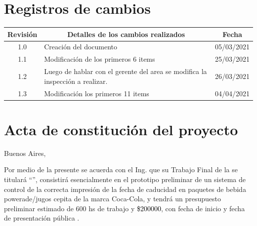\documentclass[11pt]{charter}
\begin{document}
\maketitle
\thispagestyle{empty}
\pagebreak


\thispagestyle{empty}
{\setlength{\parskip}{0pt}
\tableofcontents{}
}
\pagebreak


\section{Registros de cambios}
\label{sec:registro}


\begin{table}[ht]
\label{tab:registro}
\centering
\begin{tabularx}{\linewidth}{@{}|c|X|c|@{}}
\hline
\rowcolor[HTML]{C0C0C0} 
Revisión & \multicolumn{1}{c|}{\cellcolor[HTML]{C0C0C0}Detalles de los cambios realizados} & Fecha      \\ \hline
1.0      & Creación del documento                                          & 05/03/2021\\ \hline
1.1      & Modificación de los primeros 6 items                                      
& 25/03/2021 \\ \hline
1.2      & Luego de hablar con el gerente del area se modifica la inspección\newline
a realizar.
& 26/03/2021 \\ \hline
1.3		 & Modificación los primeros 11 items  
& 04/04/2021 \\ \hline
\end{tabularx}
\end{table}

\pagebreak



\section{Acta de constitución del proyecto}
\label{sec:acta}

\begin{flushright}
Buenos Aires, \fechaInicioName
\end{flushright}

\vspace{2cm}

Por medio de la presente se acuerda con el Ing. \authorname\hspace{1px} que su Trabajo Final de la \degreename\hspace{1px} se titulará ``\ttitle'', consistirá esencialmente en el prototipo preliminar de un sistema de control de la correcta impresión de la fecha de caducidad en paquetes de bebida powerade/jugos cepita de la marca Coca-Cola, y tendrá un presupuesto preliminar estimado de 600 hs de trabajo y \textcolor{black}{\$200000}, con fecha de inicio \fechaInicioName\hspace{1px} y fecha de presentación pública \fechaFinalName.
\end{document}
